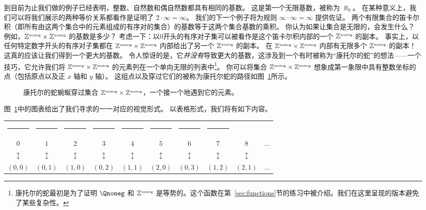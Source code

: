 到目前为止我们做的例子已经表明，整数、自然数和偶自然数都具有相同的基数。
这是第一个无限基数，被称为 $\aleph_0$。
在某种意义上，我们可以将我们展示的两种等价关系都看作是证明了 $2 \cdot \infty = \infty$。
我们的下一个例子将为规则 $\infty \cdot \infty = \infty$ 提供佐证。
两个有限集合的笛卡尔积（即所有由这两个集合中的元素组成的有序对的集合）的基数等于这两个集合基数的乘积。
你认为如果让集合是无限的，会发生什么？
例如，${\mathbb Z}^{\mbox{\tiny noneg}} \times {\mathbb Z}^{\mbox{\tiny noneg}}$ 的基数是多少？
考虑一下：以0开头的有序对子集可以被看作是这个笛卡尔积内部的一个 ${\mathbb Z}^{\mbox{\tiny noneg}}$ 的副本。
事实上，以任何特定数字开头的有序对子集都在 ${\mathbb Z}^{\mbox{\tiny noneg}} \times {\mathbb Z}^{\mbox{\tiny noneg}}$ 内部给出了另一个 ${\mathbb Z}^{\mbox{\tiny noneg}}$ 的副本。
在 ${\mathbb Z}^{\mbox{\tiny noneg}} \times {\mathbb Z}^{\mbox{\tiny noneg}}$ 内部有无限多个 ${\mathbb Z}^{\mbox{\tiny noneg}}$ 的副本！
这真的应该让我们得到一个更大的基数。
令人惊讶的是，它\emph{并没有}导致更大的基数，这涉及到一个有时被称为“康托尔的蛇”的想法——一个技巧，它允许我们将 ${\mathbb Z}^{\mbox{\tiny noneg}} \times {\mathbb Z}^{\mbox{\tiny noneg}}$ 的元素列在一个单向无限的列表中\footnote{康托尔的蛇最初是为了证明 $\Qnoneg$ 和 ${\mathbb Z}^{\mbox{\tiny noneg}}$ 是等势的。这个函数在第~\ref{sec:functions}节的练习中被介绍。我们在这里呈现的版本避免了某些复杂性。}。
你可以将集合 ${\mathbb Z}^{\mbox{\tiny noneg}} \times {\mathbb Z}^{\mbox{\tiny noneg}}$ 想象成第一象限中具有整数坐标的点（包括原点以及正 $x$ 轴和 $y$ 轴）。
这组点以及穿过它们的被称为康托尔蛇的路径如图~\ref{fig:cantors_snake_2}所示。

\begin{figure}[!btp]
    
    \caption[康托尔的蛇。]{康托尔的蛇蜿蜒穿过集合 %
        ${\mathbb Z}^{\mbox{\tiny noneg}} \times {\mathbb Z}^{\mbox{\tiny noneg}}$，一个接一个地遇到它的元素。}
    \label{fig:cantors_snake_2}
\end{figure}

图~\ref{fig:cantors_snake_2}中的图表给出了我们寻求的一一对应的视觉形式。
以表格形式，我们将有如下内容。

\medskip

\begin{tabular}{cccccccccc}
    \rule{32pt}{0pt} & \rule{32pt}{0pt} & \rule{32pt}{0pt} & \rule{32pt}{0pt} & \rule{32pt}{0pt} & \rule{32pt}{0pt} & \rule{32pt}{0pt} & \rule{32pt}{0pt}                             \\
    $0$              & $1$              & $2$              & $3$              & $4$              & $5$              & $6$              & $7$              & $8$            & $\ldots$ \\
    $\updownarrow$   & $\updownarrow$   & $\updownarrow$   & $\updownarrow$   & $\updownarrow$   & $\updownarrow$   & $\updownarrow$   & $\updownarrow$   & $\updownarrow$ &          \\
    $(0, 0)$         & $(0, 1)$         & $(1, 0)$         & $(0, 2)$         & $(1, 1)$         & $(2, 0)$         & $(0, 3)$         & $(1,2)$          & $(2, 1)$       & $\ldots$ \\
\end{tabular}
\medskip

